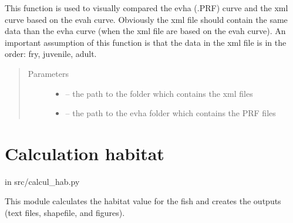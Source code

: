 \documentclass[letterpaper,10pt,english]{sphinxmanual}
\begin{document}
\begin{fulllineitems}
\label{\detokenize{index:src.bio_info.test_evah_xml_pref}}
This function is used to visually compared the evha (.PRF) curve and the xml curve based on the evah curve.
Obviously the xml file should contain the same data than the evha curve (when the xml file are based on the evah
curve). An important assumption of this function is that the data in the xml file is in the order: fry, juvenile,
adult.
\begin{quote}\begin{description}
\item[{Parameters}] \leavevmode\begin{itemize}
\item {} 
 -- the path to the folder which contains the xml files

\item {} 
 -- the path to the evha folder which contains the PRF files

\end{itemize}

\end{description}\end{quote}

\end{fulllineitems}



\section{Calculation habitat}
\label{\detokenize{index:calculation-habitat}}
in src/calcul\_hab.py

This module calculates the habitat value for the fish and creates the outputs (text files, shapefile, and figures).
\label{\detokenize{index:module-src.calcul_hab}}
\end{document}
